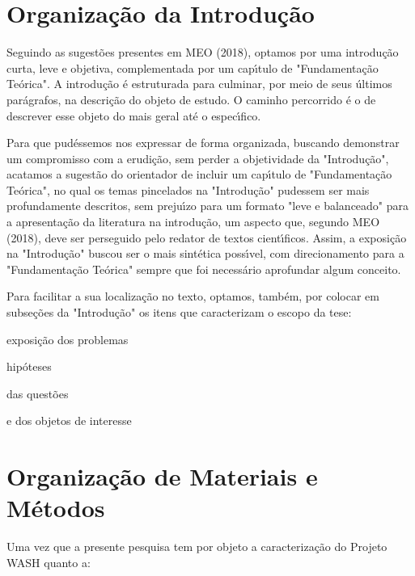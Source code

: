 \documentclass[
12pt,		%
openright,	%
twoside,  %
a4paper,			%
chapter=TITLE,		%
english,			%
french,				%
spanish,			%
brazil				%
]{USPSC-classe/USPSC}
\begin{document}
\section[Organiza\c{c}\~ao da Introdu\c{c}\~ao]{Organiza\c{c}\~ao da Introdu\c{c}\~ao}\label{Organiza\c{c}\~ao da Introdu\c{c}\~ao}
Seguindo as sugest\~oes presentes em MEO (2018), optamos por uma introdu\c{c}\~ao curta, leve e objetiva, complementada por um cap\'{\i}tulo de "Fundamenta\c{c}\~ao Te\'orica". A introdu\c{c}\~ao \'e estruturada para culminar, por meio de seus \'ultimos par\'agrafos, na descri\c{c}\~ao do objeto de estudo. O caminho percorrido \'e o de descrever esse objeto do mais geral at\'e o espec\'{\i}fico.


Para que pud\'essemos nos expressar de forma organizada, buscando demonstrar um compromisso com a erudi\c{c}\~ao, sem perder a objetividade da "Introdu\c{c}\~ao", acatamos a sugest\~ao do orientador de incluir um cap\'{\i}tulo de "Fundamenta\c{c}\~ao Te\'orica", no qual os temas pincelados na "Introdu\c{c}\~ao" pudessem ser mais profundamente descritos, sem preju\'{\i}zo para um formato "leve e balanceado" para a apresenta\c{c}\~ao da literatura na introdu\c{c}\~ao, um aspecto que, segundo  MEO (2018), deve ser perseguido pelo redator de textos cient\'{\i}ficos. Assim, a exposi\c{c}\~ao na "Introdu\c{c}\~ao" buscou ser o mais sint\'etica poss\'{\i}vel, com direcionamento para a "Fundamenta\c{c}\~ao Te\'orica" sempre que foi necess\'ario aprofundar algum conceito.


Para facilitar a sua localiza\c{c}\~ao no texto, optamos, tamb\'em, por colocar em subse\c{c}\~oes da "Introdu\c{c}\~ao" os itens que caracterizam o escopo da tese:



\begin{alineas}
\item exposi\c{c}\~ao dos problemas
\item hip\'oteses
\item das quest\~oes
\item e dos objetos de interesse
\end{alineas}

\section[Organiza\c{c}\~ao de Materiais e M\'etodos]{Organiza\c{c}\~ao de Materiais e M\'etodos}\label{Organiza\c{c}\~ao de Materiais e M\'etodos}
Uma vez que a presente pesquisa tem por objeto a caracteriza\c{c}\~ao do Projeto WASH quanto a:
\end{document}
